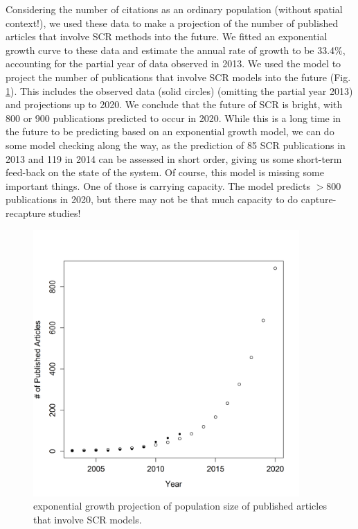 Considering the number of citations as an ordinary population (without
spatial context!), we used these data to make a projection of the
number of published articles that involve SCR methods into the future.
We fitted an exponential growth curve to these data and estimate the
annual rate of growth to be 33.4\%, accounting for the partial year of
data observed in 2013.
We used the model to project the number of
publications that involve SCR models into the future
(Fig. \ref{last.fig.expgrowth}). This includes the observed data
(solid circles) (omitting the partial year 2013) and projections up to
2020.  We conclude that the future of SCR is bright, with 800 or 900
publications predicted to occur in 2020. While this is a long time in
the future to be predicting based on an exponential growth model, we
can do some model checking along the way, as the prediction of 85 SCR
publications in 2013 and 119 in 2014 can be assessed in short order,
giving us some short-term feed-back on the state of the system.  Of
course, this model is missing some important things. One of those is
carrying capacity. The model predicts $>800$ publications in 2020, but
there may not be that much capacity to do capture-recapture studies!


\begin{figure}[ht]
\centering
\includegraphics[width=4in,height=4in]{Ch20-Last/exp_growth.png}
\caption{
exponential growth projection of population size of published articles
that involve SCR models.
}
\label{last.fig.expgrowth}
\end{figure}


